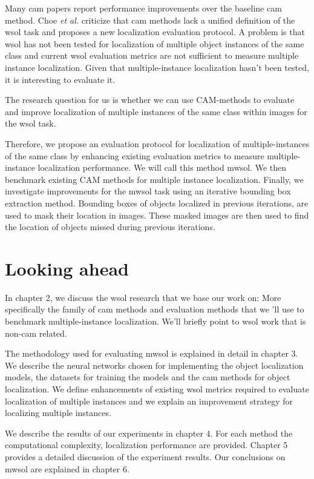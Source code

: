 Many \acrshort{cam} papers report performance improvements over the baseline \acrshort{cam} method. Choe \textit{et al.} \cite{choe2020evaluating} criticize that \acrshort{cam} methods lack a unified definition of the \acrshort{wsol} task and proposes a new localization evaluation protocol. A problem is that \acrshort{wsol} has not been tested for localization of multiple object instances of the same class and current \acrshort{wsol} evaluation metrics are not sufficient to measure multiple instance localization. Given that multiple-instance localization hasn't been tested, it is interesting to evaluate it. 

The research question for us is whether we can use CAM-methods to evaluate and improve localization of multiple instances of the same class within images for the \acrshort{wsol} task.

Therefore, we propose an evaluation protocol for localization of multiple-instances of the same class by enhancing existing evaluation metrics \cite{choe2020evaluating} to measure multiple-instance localization performance. We will call this method \acrfull{mwsol}. We then benchmark existing CAM methods for multiple instance localization. Finally, we investigate improvements for the \acrshort{mwsol} task using an iterative bounding box extraction method. Bounding boxes of objects localized in previous iterations, are used to mask their location in images. These masked images are then used to find the location of objects missed during previous iterations.

\section{Looking ahead}
In chapter 2, we discuss the \acrshort{wsol} research that we base our work on: More specifically the family of \acrshort{cam} methods and evaluation methods that we 'll use to benchmark multiple-instance localization. We'll briefly point to \acrshort{wsol} work that is  non-\acrshort{cam} related. 

The methodology used for evaluating \acrlong{mwsol} is explained in detail in chapter 3. We describe the neural networks chosen for implementing the object localization models, the datasets for training the models and the \acrshort{cam} methods for object localization. We define enhancements of existing \acrshort{wsol} metrics required to evaluate localization of multiple instances and we explain an improvement strategy for localizing multiple instances.

We describe the results of our experiments in chapter 4. For each method the computational complexity, localization performance are provided. Chapter 5 provides a detailed discussion of the experiment results. Our conclusions on \acrshort{mwsol} are explained in chapter 6.